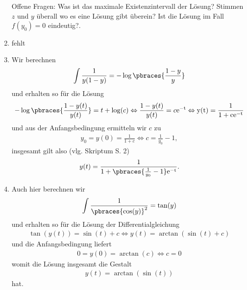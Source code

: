 \begin{solution}
\begin{enumerate}[label = \alph*)]
        Offene Fragen: Was ist das maximale Existenzintervall der Lösung? Stimmen $z$ und $y$ überall wo es eine Lösung gibt überein? Ist die Lösung im Fall $f(y_0) = 0$ eindeutig?.
        \item fehlt
        \item Wir berechnen
        \begin{align*}
            \int \frac{1}{y(1 - y)} = -\log\pbraces{\frac{1 - y}{y}}
        \end{align*}
        und erhalten so für die Lösung
        \begin{align*}
            -\log\pbraces{\frac{1 - y(t)}{y(t)}} = t + \log(c) \Leftrightarrow \frac{1 - y(t)}{y(t)} = c\rm{e}^{-t} \Leftrightarrow y(t) = \frac{1}{1 + c\rm{e}^{-t}}
        \end{align*}
        und aus der Anfangsbedingung ermitteln wir $c$ zu
        \begin{align*}
            y_0 = y(0) = \frac{1}{1 + c} \Leftrightarrow c = \frac{1}{y_0} - 1,
        \end{align*}
        insgesamt gilt also (vlg. Skriptum S. 2)
        \begin{align*}
            y(t) = \frac{1}{1 + \pbraces{\frac{1}{y_0} - 1} \rm{e}^{-t}}.
        \end{align*}
        \item Auch hier berechnen wir 
        \begin{align*}
            \int \frac{1}{\pbraces{\cos(y)}^2} = \tan(y)
        \end{align*}
        und erhalten so für die Lösung der Differentialgleichung
        \begin{align*}
            \tan(y(t)) = \sin(t) + c \Leftrightarrow y(t) = \arctan(\sin(t) + c)
        \end{align*}
        und die Anfangsbedingung liefert
        \begin{align*}
            0 = y(0) = \arctan(c) \Leftrightarrow c = 0
        \end{align*}
        womit die Lösung insgesamt die Gestalt
        \begin{align*}
            y(t) = \arctan(\sin(t))
        \end{align*}
        hat.
    \end{enumerate}
\end{solution}